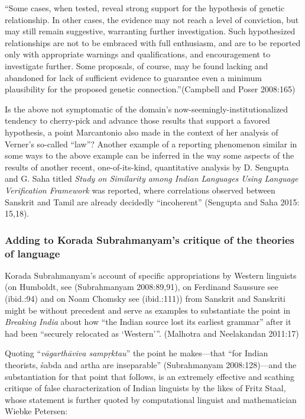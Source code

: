 \begin{myquote}
“Some cases, when tested, reveal strong support for the hypothesis of genetic relationship. In other cases, the evidence may not reach a level of conviction, but may still remain suggestive, warranting further investigation. Such hypothesized relationships are not to be embraced with full enthusiasm, and are to be reported only with appropriate warnings and qualifications, and encouragement to investigate further. Some proposals, of course, may be found lacking and abandoned for lack of sufficient evidence to guarantee even a minimum plausibility for the proposed genetic connection.”\hfill (Campbell and Poser 2008:165)
\end{myquote}

Is the above not symptomatic of the domain’s now-seemingly-institutionalized tendency to cherry-pick and advance those results that support a favored hypothesis, a point Marcantonio also made in the context of her analysis of Verner’s so-called “law”? Another example of a reporting phenomenon similar in some ways to the above example can be inferred in the way some aspects of the results of another recent, one-of-its-kind, quantitative analysis by D. Sengupta and G. Saha titled \textit{Study on Similarity among Indian Languages Using Language Verification Framework} was reported, where correlations observed between Sanskrit and Tamil are already decidedly “incoherent” (Sengupta and Saha 2015: 15,18).


\subsubsection{Adding to Korada Subrahmanyam’s critique of the theories of language}

\vskip -6pt

Korada Subrahmanyam’s account of specific appropriations by Western linguists (on Humboldt, see (Subrahmanyam 2008:89,91), on Ferdinand Saussure see (ibid.:94) and on Noam Chomsky see (ibid.:111)) from Sanskrit and Sanskriti might be without precedent and serve as examples to substantiate the point in \textit{Breaking India} about how “the Indian source lost its earliest grammar” after it had been “securely relocated as ‘Western’”. (Malhotra and Neelakandan 2011:17)

Quoting “\textit{vāgarthāviva sampṛktau}” the point he makes—that “for Indian theorists, śabda and artha are inseparable” (Subrahmanyam 2008:128)—and the substantiation for that point that follows, is an extremely effective and scathing critique of false characterization of Indian linguists by the likes of Fritz Staal, whose statement is further quoted by computational linguist and mathematician Wiebke Petersen:

